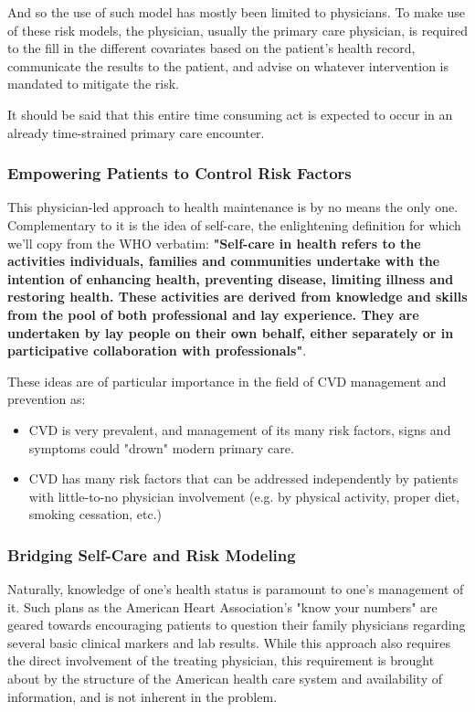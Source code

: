 \documentclass[a4paper,12pt]{article}
\begin{document}
			And so the use of such model has mostly been limited to physicians. To make use of these risk models, the physician, usually the primary care physician, is required to the fill in the different covariates based on the patient's health record, communicate the results to the patient, and advise on whatever intervention is mandated to mitigate the risk.
			
			It should be said that this entire time consuming act is expected to occur in an already time-strained primary care encounter\cite{Konrad2010}.
			
			\subsubsection{Empowering Patients to Control Risk Factors}
			This physician-led approach to health maintenance is by no means the only one. Complementary to it is the idea of self-care, the enlightening definition for which we'll copy from the WHO verbatim: \textbf{"Self-care in health refers to the activities individuals, families and communities undertake with the intention of enhancing health, preventing disease, limiting illness and restoring health. These activities are derived from knowledge and skills from the pool of both professional and lay experience. They are undertaken by lay people on their own behalf, either separately or in participative collaboration with professionals"}\cite{Organization1984}.
			
			These ideas are of particular importance in the field of CVD management and prevention as\cite{Riegel2017}:
			\begin{itemize}
				\item CVD is very prevalent, and management of its many risk factors, signs and symptoms could "drown" modern primary care.
				\item CVD has many risk factors that can be addressed independently by patients with little-to-no physician involvement (e.g. by physical activity, proper diet, smoking cessation, etc.)
			\end{itemize}
		
			\subsubsection{Bridging Self-Care and Risk Modeling}
			
			Naturally, knowledge of one's health status is paramount to one's management of it. Such plans as the American Heart Association's "know your numbers" are geared towards encouraging patients to question their family physicians regarding several basic clinical markers and lab results\cite{Riegel2017}. While this approach also requires the direct involvement of the treating physician, this requirement is brought about by the structure of the American health care system and availability of information, and is not inherent in the problem.
			
\end{document}
